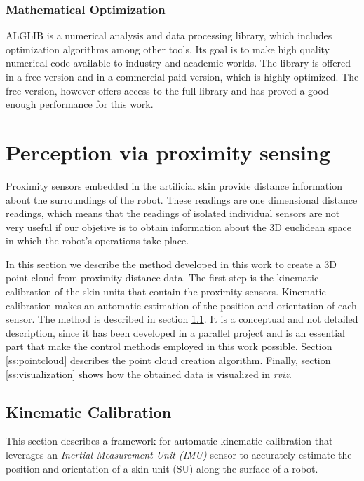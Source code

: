 \subsubsection{Mathematical Optimization}

ALGLIB \cite{alglib} is a numerical analysis and data processing library, which includes optimization algorithms among other tools. Its goal is to make high quality numerical code available to industry and academic worlds. The library is offered in a free version and in a commercial paid version, which is highly optimized. The free version, however offers access to the full library and has proved a good enough performance for this work.

\section{Perception via proximity sensing}
\label{s:perception}

Proximity sensors embedded in the artificial skin provide distance information about the surroundings of the robot. These readings are one dimensional distance readings, which means that the readings of isolated individual sensors are not very useful if our objetive is to obtain information about the 3D euclidean space in which the robot's operations take place.

In this section we describe the method developed in this work to create a 3D point cloud from proximity distance data. The first step is the kinematic calibration of the skin units that contain the proximity sensors. Kinematic calibration makes an automatic estimation of the position and orientation of each sensor. The method is described in section \ref{ss:calibration}. It is a conceptual and not detailed description, since it has been developed in a parallel project and is an essential part that make the control methods employed in this work possible. Section \ref{ss:pointcloud} describes the point cloud creation algorithm. Finally, section \ref{ss:visualization} shows how the obtained data is visualized in \textit{rviz}.

\subsection{Kinematic Calibration}
\label{ss:calibration}

This section describes a framework for automatic kinematic calibration that leverages an
\textit{Inertial Measurement Unit (IMU)} sensor to accurately estimate the position and orientation of a skin unit (SU) along the surface of a robot.


